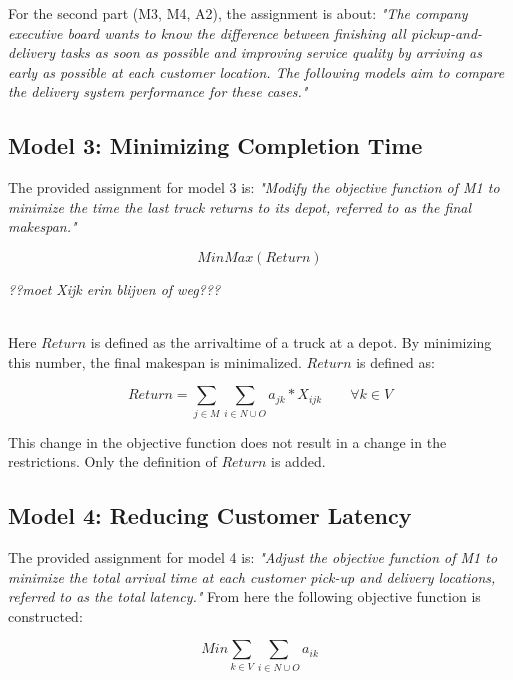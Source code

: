 For the second part (M3, M4, A2), the assignment is about: \textit{"The company executive board wants to know the difference between finishing all pickup-and-delivery tasks as soon as possible and improving service quality by arriving as early as possible at each customer location. The following models aim to compare the delivery system performance for these cases." }

\vspace{0.5cm}
\subsection{Model 3: Minimizing Completion Time}
The provided assignment for model 3 is: \textit{"Modify the objective function of M1 to minimize the time the last truck returns to its depot, referred to as the final makespan."}


\begin{equation} 
Min Max (Return)
\label{M3 Objective function}
\end{equation}

\textit{??moet Xijk erin blijven of weg???\\ \\}

Here $Return$ is defined as the arrivaltime of a truck at a depot. By minimizing this number, the final makespan is minimalized. $Return$ is defined as:

\begin{equation} 
Return = \sum_{j \in M} \sum_{i \in N \cup O} a_{jk} * X_{ijk} \qquad \forall k \in V
\label{F M3 Return equation}
\end{equation}


This change in the objective function does not result in a change in the restrictions. Only the definition of $Return$ is added. 



\vspace{0.5cm}
\subsection{Model 4: Reducing Customer Latency}
The provided assignment for model 4 is: \textit{"Adjust the objective function of M1 to minimize the total arrival time at each customer pick-up and delivery locations, referred to as the total latency."} From here the following objective function is constructed:

\begin{equation} 
Min \sum_{k \in V} \sum_{i \in N \cup O} a_{ik}
\label{M4 Objective function}
\end{equation}

